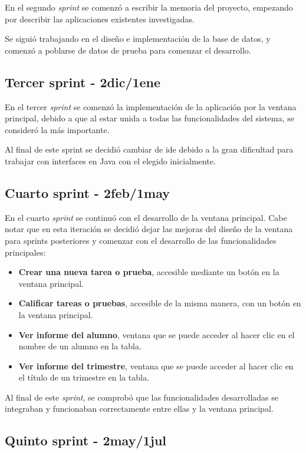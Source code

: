 En el segundo \textit{sprint} se comenzó a escribir la memoria del proyecto, empezando por describir las aplicaciones existentes investigadas.

Se siguió trabajando en el diseño e implementación de la base de datos, y comenzó a poblarse de datos de prueba para comenzar el desarrollo.


\subsection{Tercer sprint - 2dic/1ene}

En el tercer \textit{sprint} se comenzó la implementación de la aplicación por la ventana principal, debido a que al estar unida a todas las funcionalidades del sistema, se consideró la más importante.

Al final de este sprint se decidió cambiar de \gls{ide} debido a la gran dificultad para trabajar con interfaces en Java con el elegido inicialmente.

\subsection{Cuarto sprint - 2feb/1may}

En el cuarto \textit{sprint} se continuó con el desarrollo de la ventana principal. Cabe notar que en esta iteración se decidió dejar las mejoras del diseño de la ventana para sprints posteriores y comenzar con el desarrollo de las funcionalidades principales:
\begin{itemize}
	\item \textbf{Crear una nueva tarea o prueba}, accesible mediante un botón en la ventana principal.
	\item \textbf{Calificar tareas o pruebas}, accesible de la misma manera, con un botón en la ventana principal.
	\item \textbf{Ver informe del alumno}, ventana que se puede acceder al hacer clic en el nombre de un alumno en la tabla.
	\item \textbf{Ver informe del trimestre}, ventana que se puede acceder al hacer clic en el título de un trimestre en la tabla.
\end{itemize}


Al final de este \textit{sprint}, se comprobó que las funcionalidades desarrolladas se integraban y funcionaban correctamente entre ellas y la ventana principal.

\subsection{Quinto sprint - 2may/1jul}

